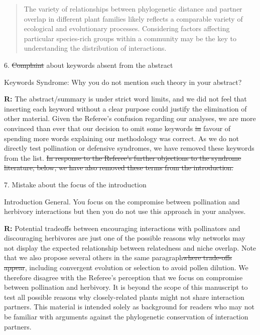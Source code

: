 \documentclass[12pt]{letter}
\newenvironment{refquote}{\bigskip \begin{it}}{\end{it}\smallskip}
\providecommand{\DIFadd}[1]{{\protect\color{blue}\uwave{#1}}} %
\providecommand{\DIFdel}[1]{{\protect\color{red}\sout{#1}}}                      %
\providecommand{\DIFaddbegin}{} %
\providecommand{\DIFaddend}{} %
\providecommand{\DIFdelbegin}{} %
\providecommand{\DIFdelend}{} %
\newcommand{\DIFscaledelfig}{0.5}
\newlength{\DIFdelgraphicswidth} %
\newlength{\DIFdelgraphicsheight} %
\newcommand{\DIFaddincludegraphics}[2][]{{\color{blue}\fbox{\DIFOincludegraphics[#1]{#2}}}} %
\newcommand{\DIFdelincludegraphics}[2][]{%
\sbox{\DIFdelgraphicsbox}{\DIFOincludegraphics[#1]{#2}}%
\settoboxwidth{\DIFdelgraphicswidth}{\DIFdelgraphicsbox} %
\settoboxtotalheight{\DIFdelgraphicsheight}{\DIFdelgraphicsbox} %
\scalebox{\DIFscaledelfig}{%
\parbox[b]{\DIFdelgraphicswidth}{\usebox{\DIFdelgraphicsbox}\\[-\baselineskip] \rule{\DIFdelgraphicswidth}{0em}}\llap{\resizebox{\DIFdelgraphicswidth}{\DIFdelgraphicsheight}{%
\setlength{\unitlength}{\DIFdelgraphicswidth}%
\begin{picture}(1,1)%
\thicklines\linethickness{2pt} %
{\color[rgb]{1,0,0}\put(0,0){\framebox(1,1){}}}%
{\color[rgb]{1,0,0}\put(0,0){\line( 1,1){1}}}%
{\color[rgb]{1,0,0}\put(0,1){\line(1,-1){1}}}%
\end{picture}%
}\hspace*{3pt}}} %
} %
\DeclareRobustCommand{\DIFaddbegin}{\DIFOaddbegin \let\includegraphics\DIFaddincludegraphics} %
\DeclareRobustCommand{\DIFaddend}{\DIFOaddend \let\includegraphics\DIFOincludegraphics} %
\DeclareRobustCommand{\DIFdelbegin}{\DIFOdelbegin \let\includegraphics\DIFdelincludegraphics} %
\DeclareRobustCommand{\DIFdelend}{\DIFOaddend \let\includegraphics\DIFOincludegraphics} %
\begin{document}
		\begin{quotation}
		    \item The variety of relationships between phylogenetic distance and partner overlap in different plant families likely reflects a comparable variety of ecological and evolutionary processes. Considering factors affecting particular species-rich groups within a community may be the key to understanding the distribution of interactions.
		\end{quotation}


	6. \DIFdelbegin \DIFdel{Complaint }\DIFdelend \DIFaddbegin \DIFadd{Comment }\DIFaddend about keywords absent from the abstract

		\begin{refquote}
		Keywords
		\DIFdelbegin %
\DIFdelend Syndrome:  Why you do not mention such theory in your abstract?
		\end{refquote}


		\textbf{R:} The abstract/summary is under strict word limits, and we did not feel that inserting each keyword without a clear purpose could justify the elimination of other material. Given the Referee's confusion regarding our analyses, we are more convinced than ever that our decision to omit some keywords \DIFdelbegin \DIFdel{in }\DIFdelend \DIFaddbegin \DIFadd{(which do appear in the introduction) in }\DIFaddend favour of spending more words explaining our methodology was correct. As we do not directly test pollination or defensive syndromes, we have removed these keywords from the list.
\DIFdelbegin \DIFdel{In response to the Referee's further objections to the syndrome literature, below, we have also removed these terms from the introduction.
}\DIFdelend 


	7. Mistake about the focus of the introduction

		\begin{refquote}
		Introduction
		\DIFdelbegin %
\DIFdelend General. You focus on the compromise between pollination and herbivory interactions but then you do not use this approach in your analyses.
		\end{refquote}


		\textbf{R:} Potential tradeoffs between encouraging interactions with pollinators and discouraging herbivores are just one of the possible reasons why networks may not display the expected relationship between relatedness and niche overlap. Note that we also propose several others in the same paragraph\DIFdelbegin \DIFdel{where trade-offs appear}\DIFdelend , including convergent evolution or selection to avoid pollen dilution. We therefore disagree with the Referee's perception that we focus on compromise between pollination and herbivory. It is beyond the scope of this manuscript to test all possible reasons why closely-related plants might not share interaction partners. This material is intended solely as background for readers who may not be familiar with arguments against the phylogenetic conservation of interaction partners.
\end{document}
